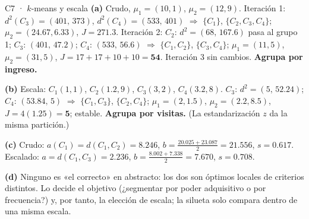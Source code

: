 \begin{solucion}{C7 · $k$-means y escala}
\textbf{(a)} Crudo, $\mu_1=(10,1)$, $\mu_2=(12,9)$. Iteración 1: $d^2(C_3)=(401,\,373)$, $d^2(C_4)=(533,\,401)$ $\Rightarrow$ $\{C_1\}$, $\{C_2,C_3,C_4\}$;
$\mu_2=(24.67,6.33)$, $J=271.3$. Iteración 2: $C_2$: $d^2=(68,\,167.6)$ pasa al grupo 1; $C_3$: $(401,\,47.2)$; $C_4$: $(533,\,56.6)$ $\Rightarrow$
$\{C_1,C_2\}$, $\{C_3,C_4\}$; $\mu_1=(11,5)$, $\mu_2=(31,5)$, $J=17+17+10+10=\mathbf{54}$. Iteración 3 sin cambios. \textbf{Agrupa por ingreso.}

\textbf{(b)} Escala: $C_1(1,1)$, $C_2(1.2,9)$, $C_3(3,2)$, $C_4(3.2,8)$. $C_3$: $d^2=(5,\,52.24)$; $C_4$: $(53.84,\,5)$ $\Rightarrow$ $\{C_1,C_3\}$, $\{C_2,C_4\}$;
$\mu_1=(2,1.5)$, $\mu_2=(2.2,8.5)$, $J=4(1.25)=\mathbf{5}$; estable. \textbf{Agrupa por visitas.} (La estandarización $z$ da la misma partición.)

\textbf{(c)} Crudo: $a(C_1)=d(C_1,C_2)=8.246$, $b=\frac{20.025+23.087}2=21.556$, $s=\mathbf{0.617}$.
Escalado: $a=d(C_1,C_3)=2.236$, $b=\frac{8.002+7.338}2=7.670$, $s=\mathbf{0.708}$.

\textbf{(d)} Ninguno es «el correcto» en abstracto: los dos son óptimos locales de criterios distintos. Lo decide el objetivo (¿segmentar por
poder adquisitivo o por frecuencia?) y, por tanto, la elección de escala; la silueta solo compara dentro de una misma escala.
\end{solucion}

